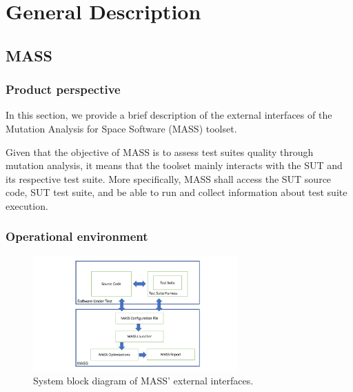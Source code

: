 
\chapter{General Description}

\section{MASS}

\subsection{Product perspective}


In this section, we provide a brief description of the external interfaces of the Mutation Analysis for Space Software (MASS) toolset.

Given that the objective of MASS is to assess test suites quality through mutation analysis, it means that the toolset mainly interacts with the SUT and its respective test suite. More specifically, MASS shall access the SUT source code, SUT test suite, and be able to run and collect information about test suite execution.

\subsection{Operational environment}


\begin{figure}[t]
  \centering
  \includegraphics[width=0.7\textwidth]{images/mass-external.pdf}
      \caption{System block diagram of MASS' external interfaces.}
      \label{fig:mass:external}
\end{figure}

